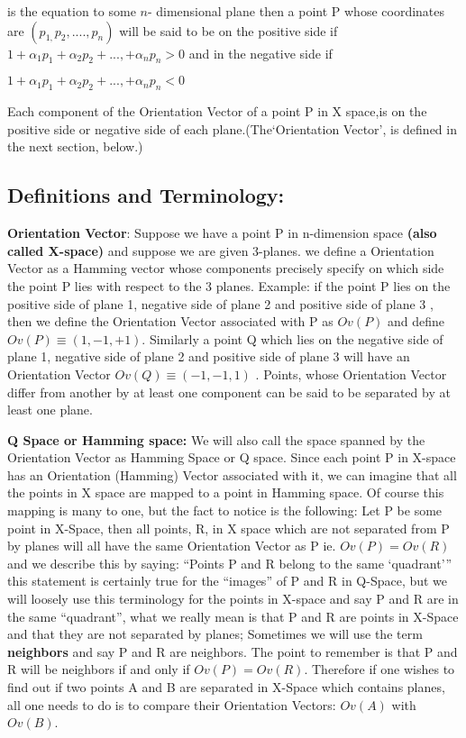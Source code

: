 \documentclass[english]{article}
\begin{document}
is the equation to some $n$- dimensional plane then a point P whose
coordinates are $(p_{1,}p_{2},....,p_{n})$ will be said to be on
the positive side if $1+\alpha_{1}p_{1}+\alpha_{2}p_{2}+...,+\alpha_{n}p_{n}>0$
and in the negative side if

$1+\alpha_{1}p_{1}+\alpha_{2}p_{2}+...,+\alpha_{n}p_{n}<0$

Each component of the Orientation Vector of a point P in X space,is on the positive side or negative side of each plane.(The`Orientation Vector', is defined in the next section, below.)

\subsection{Definitions and Terminology: }

\textbf{Orientation Vector}: Suppose we have a point P in n-dimension
space \textbf{(also called X-space)} and suppose we are given 3-planes.
we define a Orientation Vector as a Hamming vector whose components
precisely specify on which side the point P lies with respect to the
3 planes. Example: if the point P lies on the positive side of plane
1, negative side of plane 2 and positive side of plane 3 , then we
define the Orientation Vector associated with P as $Ov(P)$ and define
$Ov(P)\equiv(1,-1,+1)$. Similarly a point Q which lies on the negative
side of plane 1, negative side of plane 2 and positive side of plane
3 will have an Orientation Vector $Ov(Q)\equiv(-1,-1,1)$ . Points,
whose Orientation Vector differ from another by at least one component
can be said to be separated by at least one plane.

\textbf{Q Space or Hamming space: }We will also call the space spanned
by the Orientation Vector as Hamming Space or Q space. Since each
point P in X-space has an Orientation (Hamming) Vector associated
with it, we can imagine that all the points in X space are mapped
to a point in Hamming space. Of course this mapping is many to one,
but the fact to notice is the following: Let P be some point in X-Space,
then all points, R, in X space which are not separated from P by planes
will all have the same Orientation Vector as P ie. $Ov(P)=Ov(R)$
and we describe this by saying: {}``Points P and R belong to the
same `quadrant''' this statement is certainly true for the {}``images''
of P and R in Q-Space, but we will loosely use this terminology for
the points in X-space and say P and R are in the same {}``quadrant'',
what we really mean is that P and R are points in X-Space and that
they are not separated by planes; Sometimes we will use the term \textbf{neighbors}
and say P and R are neighbors. The point to remember is that P and
R will be neighbors if and only if $Ov(P)=Ov(R)$. Therefore if one
wishes to find out if two points A and B are separated in X-Space
which contains planes, all one needs to do is to compare their Orientation
Vectors: $Ov(A)$ with $Ov(B)$.
\end{document}
